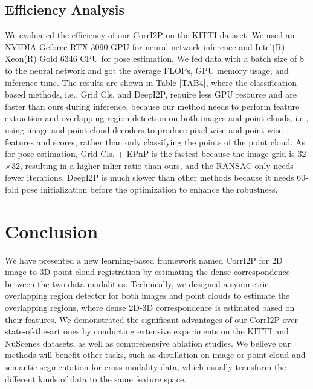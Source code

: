 \documentclass[lettersize,journal]{IEEEtran}
\begin{document}
\subsection{Efficiency Analysis}
We evaluated the efficiency of our CorrI2P on the KITTI dataset. We used an NVIDIA Geforce RTX 3090 GPU for neural network inference and Intel(R) Xeon(R) Gold 6346 CPU for pose estimation. We fed data with a batch size of 8 to the neural network and got the average FLOPs, GPU memory usage, and inference time. The results are shown in Table \ref{TAB4}, where the classification-based methods, i.e., Grid Cls. and DeepI2P, require less GPU resource and are faster than ours during inference, because our method needs to perform feature extraction and overlapping region detection on both images and point clouds, i.e., using image and point cloud decoders to produce pixel-wise and point-wise features and scores, rather than only classifying the points of the point cloud. As for pose estimation, Grid Cls. + EPnP is the fastest because the image grid is 32$\times$32, resulting in a higher inlier ratio than ours, and the RANSAC only needs fewer iterations. DeepI2P is much slower than other methods because it needs 60-fold pose initialization before the optimization to enhance the robustness.

\section{Conclusion}
\label{sec:con}
We have presented a new learning-based framework named CorrI2P for 2D image-to-3D point cloud registration by estimating the dense correspondence between the two data modalities. Technically,  
we designed a symmetric overlapping region detector for both images and point clouds to estimate the overlapping regions, where dense 2D-3D correspondence is estimated based on their features. We demonstrated the significant advantages of our CorrI2P over state-of-the-art ones by conducting extensive experiments on the KITTI and NuScenes datasets, as well as comprehensive ablation studies. We believe our methods will benefit other tasks, such as distillation on image or point cloud and semantic segmentation for cross-modality data, which usually transform the different kinds of data to the same feature space.





\end{document}
